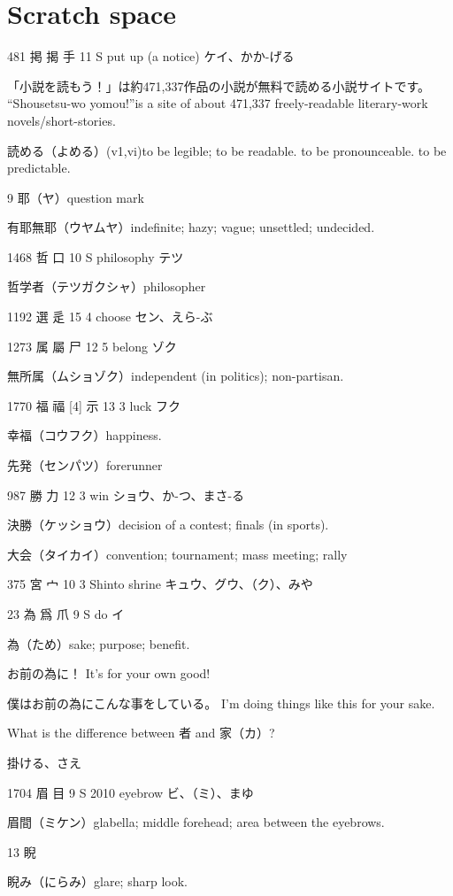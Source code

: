 \chapter{Scratch space}

481	掲	揭	手	11	S		put up (a notice)	ケイ、かか-げる

「小説を読もう！」は約471,337作品の小説が無料で読める小説サイトです。
``Shousetsu-wo yomou!''is a site of about 471,337 freely-readable literary-work novels/short-stories.

読める（よめる）(v1,vi)to be legible; to be readable.
to be pronounceable.
to be predictable.

9 耶（ヤ）question mark

有耶無耶（ウヤムヤ）indefinite; hazy; vague; unsettled; undecided.

1468	哲		口	10	S		philosophy	テツ

哲学者（テツガクシャ）philosopher

1192	選		辵	15	4		choose	セン、えら-ぶ

1273	属	屬	尸	12	5		belong	ゾク

無所属（ムショゾク）independent (in politics); non-partisan.

1770	福	福 [4]	示	13	3		luck	フク

幸福（コウフク）happiness.

先発（センパツ）forerunner

987	勝		力	12	3		win	ショウ、か-つ、まさ-る

決勝（ケッショウ）decision of a contest; finals (in sports).

大会（タイカイ）convention; tournament; mass meeting; rally

375	宮		宀	10	3		Shinto shrine	キュウ、グウ、（ク）、みや

23	為	爲	爪	9	S		do	イ

為（ため）sake; purpose; benefit.

お前の為に！
It's for your own good!

僕はお前の為にこんな事をしている。
I'm doing things like this for your sake.

What is the difference between 者 and 家（カ）?

掛ける、さえ

1704	眉		目	9	S	2010	eyebrow	ビ、（ミ）、まゆ

眉間（ミケン）glabella; middle forehead; area between the eyebrows.

13 睨

睨み（にらみ）glare; sharp look.

